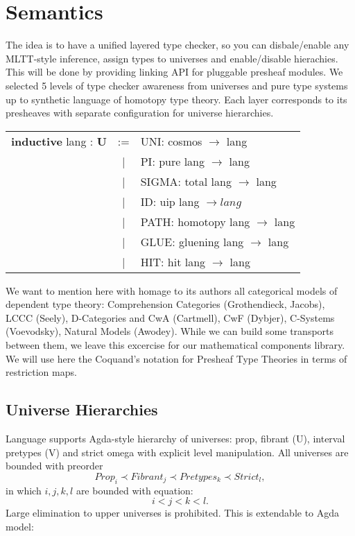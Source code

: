 \documentclass[a4paper,UKenglish,cleveref, autoref, thm-restate]{lipics-v2021}
\newcommand{\tabstyle}[0]{\scriptsize\ttfamily\fontseries{l}\selectfont}
\begin{document}
\newpage
\section{Semantics}
The idea is to have a unified layered type checker, so you can disbale/enable any MLTT-style inference, assign types to universes and enable/disable hierachies. This will be done by providing linking API for pluggable presheaf modules. We selected 5 levels of type checker awareness from universes and pure type systems up to synthetic language of homotopy type theory. Each layer corresponds to its presheaves with separate configuration for universe hierarchies.
\begin{table}[ht]
\tabstyle
\begin{tabular}{rcl}
 \textbf{inductive} lang : \textbf{U} & := & UNI: cosmos $\rightarrow$ lang \\
   & | & PI: pure lang $\rightarrow$ lang \\
   & | & SIGMA: total lang $\rightarrow$ lang \\
   & | & ID: uip lang $\rightarrow lang$ \\
   & | & PATH: homotopy lang $\rightarrow$ lang \\
   & | & GLUE: gluening lang $\rightarrow$ lang \\
   & | & HIT: hit lang $\rightarrow$ lang \\
\end{tabular}
\end{table}
We want to mention here with homage to its authors all categorical models of dependent type theory: Comprehension Categories (Grothendieck, Jacobs), LCCC (Seely), D-Categories and CwA (Cartmell), CwF (Dybjer), C-Systems (Voevodsky), Natural Models (Awodey). While we can build some transports between them, we leave this excercise for our mathematical components library.
We will use here the Coquand's notation for Presheaf Type Theories in terms of restriction maps.

\subsection{Universe Hierarchies}

Language supports Agda-style hierarchy of universes: prop, fibrant (U), interval pretypes (V) and strict omega
with explicit level manipulation. All universes are bounded with preorder
\begin{equation}
Prop_i \prec Fibrant_j \prec Pretypes_k \prec Strict_l,
\end{equation}
in which $i,j,k,l$ are bounded with equation:
\begin{equation}
i < j < k < l.
\end{equation}
Large elimination to upper universes is prohibited. This is extendable to Agda model:
\end{document}
